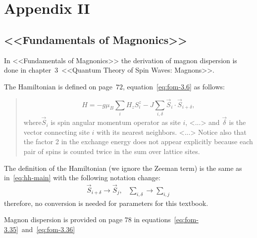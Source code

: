 \section{Appendix II}

\subsection{<<Fundamentals of Magnonics>>\cite{rezende2020fundamentals}}

    In <<Fundamentals of Magnonics>> the derivation of magnon dispersion is done in chapter~$3$~<<Quantum Theory of Spin Waves: Magnons>>.

    The Hamiltonian is defined on page~$72$, equation~\eqref{eq:fom-3.6} as follows:

    \begin{quote}
        \begin{equation}
            H = -g\mu_B\sum_iH_zS_i^z - J\sum_{i, \delta}\vec{S}_i \cdot \vec{S}_{i+\delta}, \label{eq:fom-3.6} \tag{3.6}
        \end{equation}
        where$\vec{S}_i$ is spin angular momentum operator as site $i$, <...> and $\vec{\delta}$ is the vector connecting site $i$ with its nearest neighbors. 
        <...> Notice also that the factor 2 in the exchange energy does not appear explicitly because each pair of spins is counted twice in the sum over lattice sites.
    \end{quote}

    The definition of the Hamiltonian (we ignore the Zeeman term) is the same as in~\eqref{eq:hh-main} with the following notation change:
    \begin{equation}
        \begin{matrix} 
            \vec{S}_{i+\delta} \rightarrow \vec{S}_j, & \sum_{i, \delta} \rightarrow \sum_{i,j}
        \end{matrix}
    \end{equation}
    therefore, no conversion is needed for parameters for this textbook.

    Magnon dispersion is provided on page $78$ in equations~\eqref{eq:fom-3.35}~and~\eqref{eq:fom-3.36}

